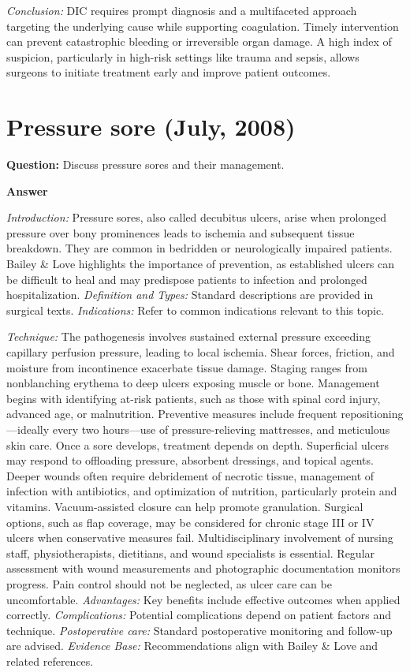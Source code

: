 \documentclass{article}
\begin{document}
\emph{Conclusion:} DIC requires prompt diagnosis and a multifaceted approach targeting the underlying cause while supporting coagulation. Timely intervention can prevent catastrophic bleeding or irreversible organ damage. A high index of suspicion, particularly in high-risk settings like trauma and sepsis, allows surgeons to initiate treatment early and improve patient outcomes.


\section{Pressure sore (July, 2008)}

\textbf{Question:} Discuss pressure sores and their management.

\textbf{Answer}

\emph{Introduction:} Pressure sores, also called decubitus ulcers, arise when prolonged pressure over bony prominences leads to ischemia and subsequent tissue breakdown. They are common in bedridden or neurologically impaired patients. Bailey & Love highlights the importance of prevention, as established ulcers can be difficult to heal and may predispose patients to infection and prolonged hospitalization.
\emph{Definition and Types:} Standard descriptions are provided in surgical texts.
\emph{Indications:} Refer to common indications relevant to this topic.

\emph{Technique:} The pathogenesis involves sustained external pressure exceeding capillary perfusion pressure, leading to local ischemia. Shear forces, friction, and moisture from incontinence exacerbate tissue damage. Staging ranges from nonblanching erythema to deep ulcers exposing muscle or bone. Management begins with identifying at-risk patients, such as those with spinal cord injury, advanced age, or malnutrition. Preventive measures include frequent repositioning—ideally every two hours—use of pressure-relieving mattresses, and meticulous skin care. Once a sore develops, treatment depends on depth. Superficial ulcers may respond to offloading pressure, absorbent dressings, and topical agents. Deeper wounds often require debridement of necrotic tissue, management of infection with antibiotics, and optimization of nutrition, particularly protein and vitamins. Vacuum-assisted closure can help promote granulation. Surgical options, such as flap coverage, may be considered for chronic stage III or IV ulcers when conservative measures fail. Multidisciplinary involvement of nursing staff, physiotherapists, dietitians, and wound specialists is essential. Regular assessment with wound measurements and photographic documentation monitors progress. Pain control should not be neglected, as ulcer care can be uncomfortable.
\emph{Advantages:} Key benefits include effective outcomes when applied correctly.
\emph{Complications:} Potential complications depend on patient factors and technique.
\emph{Postoperative care:} Standard postoperative monitoring and follow-up are advised.
\emph{Evidence Base:} Recommendations align with Bailey & Love and related references.
\end{document}
